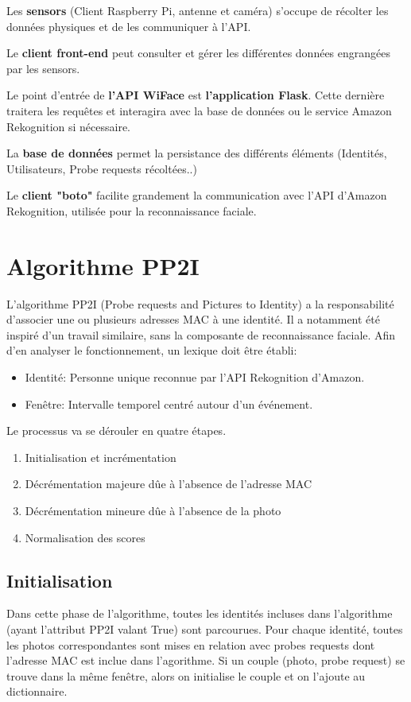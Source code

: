 Les \textbf{sensors} (Client Raspberry Pi, antenne et caméra) s'occupe de récolter les données physiques et de les communiquer à l'API.

Le \textbf{client front-end} peut consulter et gérer les différentes données engrangées par les sensors.

Le point d'entrée de \textbf{l'API WiFace} est \textbf{l'application Flask}. Cette dernière traitera les requêtes
et interagira avec la base de données ou le service Amazon Rekognition si nécessaire.

La \textbf{base de données} permet la persistance des différents éléments (Identités, Utilisateurs, Probe requests récoltées..)

Le \textbf{client "boto"} facilite grandement la communication avec l'API d'Amazon Rekognition, utilisée pour la reconnaissance faciale.


\section{Algorithme PP2I}
L'algorithme PP2I (Probe requests and Pictures to Identity) a la responsabilité d'associer une ou plusieurs adresses MAC à une identité. 
Il a notamment été inspiré d'un travail similaire, sans la composante de reconnaissance faciale.\cite{MACDEAKYN}
Afin d'en analyser le fonctionnement, un lexique doit être établi:
\begin{itemize}
	\item Identité: Personne unique reconnue par l'API Rekognition d'Amazon.
	\item Fenêtre: Intervalle temporel centré autour d'un événement. 
\end{itemize}

Le processus va se dérouler en quatre étapes. 
\begin{enumerate}
	\item Initialisation et incrémentation
	\item Décrémentation majeure dûe à l'absence de l'adresse MAC
	\item Décrémentation mineure dûe à l'absence de la photo
	\item Normalisation des scores
\end{enumerate}

\subsection{Initialisation}
Dans cette phase de l'algorithme, toutes les identités incluses dans l'algorithme (ayant l'attribut PP2I valant True) sont parcourues.
Pour chaque identité, toutes les photos correspondantes sont mises en relation avec probes requests dont l'adresse MAC est inclue dans l'agorithme.
Si un couple (photo, probe request) se trouve dans la même fenêtre, alors on initialise le couple et on l'ajoute au dictionnaire.

